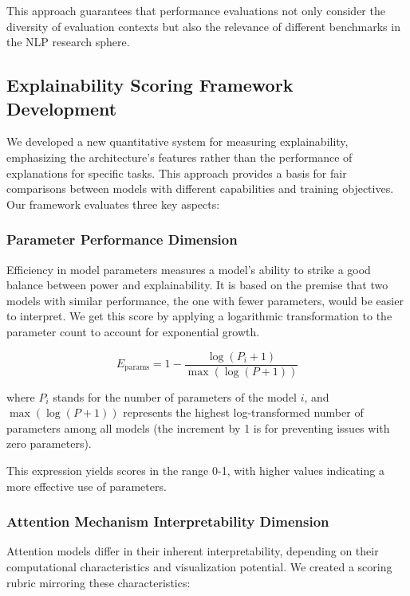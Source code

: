\documentclass[preprint,12pt]{elsarticle}
\begin{document}
This approach guarantees that performance evaluations not only consider the diversity of evaluation contexts but also the relevance of different benchmarks in the NLP research sphere.

\subsection{Explainability Scoring Framework Development}
We developed a new quantitative system for measuring explainability, emphasizing the architecture's features rather than the performance of explanations for specific tasks. This approach provides a basis for fair comparisons between models with different capabilities and training objectives. Our framework evaluates three key aspects:

\subsubsection{Parameter Performance Dimension}
Efficiency in model parameters measures a model's ability to strike a good balance between power and explainability. It is based on the premise that two models with similar performance, the one with fewer parameters, would be easier to interpret. We get this score by applying a logarithmic transformation to the parameter count to account for exponential growth.

\[E_{\text{params}} = 1 - \frac{\log(P_i + 1)}{\max(\log(P + 1))}\]

where $P_i$ stands for the number of parameters of the model $i$, and $\max(\log(P + 1))$ represents the highest log-transformed number of parameters among all models (the increment by 1 is for preventing issues with zero parameters). 

This expression yields scores in the range 0-1, with higher values indicating a more effective use of parameters.

\subsubsection{Attention Mechanism Interpretability Dimension}
Attention models differ in their inherent interpretability, depending on their computational characteristics and visualization potential. We created a scoring rubric mirroring these characteristics:
\end{document}
